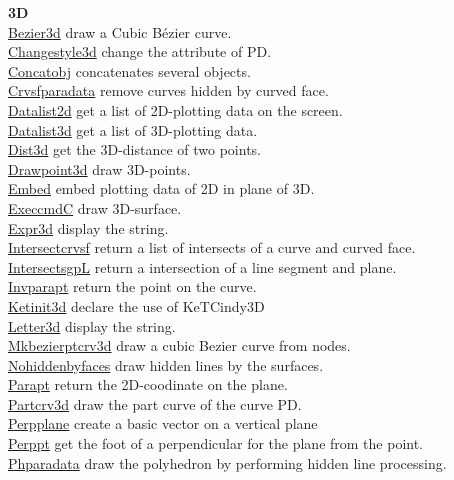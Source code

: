 \documentclass[papersize,a4paper,12pt]{article}
\begin{document}
\begin{tabbing}
{\bf \ketcindy 3D} \> \\
\hyperlink{bezier3d}{Bezier3d} \> draw a Cubic Bézier curve.\\
\hyperlink{changestyle3d}{Changestyle3d} \> change the attribute of PD.\\
\hyperlink{concatobj}{Concatobj} \> concatenates several objects.\\
\hyperlink{crvsfparadata}{Crvsfparadata} \> remove curves hidden by curved face.\\
\hyperlink{datalist2d}{Datalist2d} \> get a list of 2D-plotting data on the screen.\\
\hyperlink{datalist3d}{Datalist3d} \> get a list of 3D-plotting data.\\
\hyperlink{dist3d}{Dist3d} \> get the 3D-distance of two points.\\
\hyperlink{drawpoint3d}{Drawpoint3d} \> draw 3D-points.\\
\hyperlink{embed}{Embed} \> embed plotting data of 2D in plane of 3D.\\
\hyperlink{execcmdc}{ExeccmdC} \> draw 3D-surface.\\
\hyperlink{expr3d}{Expr3d} \> display the string.\\
\hyperlink{intersectcrvsf}{Intersectcrvsf} \> return a list of intersects of a curve and curved face.\\
\hyperlink{intersectsgpL}{IntersectsgpL} \>return a intersection of a line segment and plane.\\
\hyperlink{invparapt}{Invparapt} \> return the point on the curve.\\
\hyperlink{ketinit3d}{Ketinit3d} \> declare the use of KeTCindy3D\\
\hyperlink{letter3d}{Letter3d} \> display the string.\\
\hyperlink{mkbezierptcrv3d}{Mkbezierptcrv3d} \> draw a cubic Bezier curve from nodes.\\
\hyperlink{nohiddenbyfaces}{Nohiddenbyfaces} \>  draw hidden lines by the surfaces.\\
\hyperlink{parapt}{Parapt} \> return the 2D-coodinate on the plane.\\
\hyperlink{partcrv3d}{Partcrv3d} \> draw the part curve of the curve PD.\\
\hyperlink{perpplane}{Perpplane} \> create a basic vector on a vertical plane\\
\hyperlink{perppt}{Perppt} \> get the foot of a perpendicular for the plane from the point.\\
\hyperlink{phparadata}{Phparadata} \> draw the polyhedron by performing hidden line processing.\\

\end{tabbing}
\end{document}
